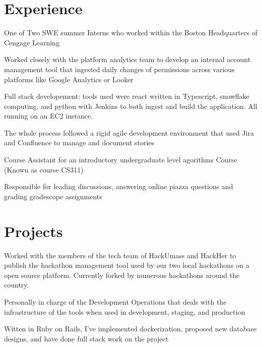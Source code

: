 \section{Experience}

\vspace{10pt}
\begin{tightemize}
    \item One of Two SWE summer Interns who worked within the Boston Headquarters of Cengage Learning
    \item Worked closely with the platform analytics team to develop an internal account management tool that ingested daily changes of permissions across various platforms like Google Analytics or Looker
    \item Full stack developement: tools used were react written in Typescript, snowflake computing, and python with Jenkins to both ingest and build the application. All running on an EC2 instance.
    \item The whole process followed a rigid agile development environment that used Jira and Confluence to manage and document stories
\end{tightemize}
\sectionsep

\begin{tightemize}
    \item Course Assistant for an introductory undergraduate level agorithms Course (Known as course CS311)
    \item Responsible for leading discussions, answering online piazza questions and grading gradescope assignments
\end{tightemize}
\sectionsep

\section{Projects}
\begin{tightemize}
    \item Worked with the members of the tech team of HackUmass and HackHer to publish the hackathon management tool used by our two local hackathons on a open source platform. Currently forked by numerous hackathons around the country.
    \item Personally in charge of the Development Operations that deals with the infrastructure of the tools when used in development, staging, and production
    \item Witten in Ruby on Rails, I've implemented dockerization, proposed new database designs, and have done full stack work on the project 
\end{tightemize}
\sectionsep

